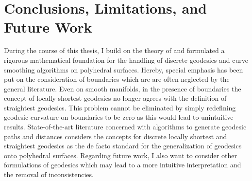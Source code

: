 \documentclass[crop=false]{stdlocal}
\begin{document}
\section{Conclusions, Limitations, and Future Work} %
\label{sec:conclusions}

  During the course of this thesis, I build on the theory of \textcite{polthier2006} and formulated a rigorous mathematical foundation for the handling of discrete geodesics and curve smoothing algorithms on polyhedral surfaces.
  Hereby, special emphasis has been put on the consideration of boundaries which are are often neglected by the general literature.
  Even on smooth manifolds, in the presence of boundaries the concept of locally shortest geodesics no longer agrees with the definition of straightest geodesics.
  This problem cannot be eliminated by simply redefining geodesic curvature on boundaries to be zero as this would lead to unintuitive results.
  State-of-the-art literature concerned with algorithms to generate geodesic paths and distances considers the concepts for discrete locally shortest and straightest geodesics as the de facto standard for the generalization of geodesics onto polyhedral surfaces.
  Regarding future work, I also want to consider other formulations of geodesics which may lead to a more intuitive interpretation and the removal of inconsistencies.

\end{document}
